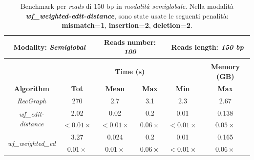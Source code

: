     \begin{table}[h]
        \centering
        \begin{tabular}{|c|c|c|c|c|c|}
            \hline
             \multicolumn{2}{|c|}{\textbf{Modality:} \emph{Semiglobal}} & \multicolumn{2}{|c|}{\textbf{Reads number: } \emph{100}} & \multicolumn{2}{|c|}{\textbf{Reads length:} \emph{150 bp}} \\
            \hline
                \multicolumn{6}{|c|}{} \\
            \hline
                & \multicolumn{4}{|c|}{\textbf{Time (s)}} & \textbf{Memory (GB)} \\
            \hline
                \textbf{Algorithm} & \textbf{Tot} & \textbf{Mean} & \textbf{Max} & \textbf{Min} & \textbf{Max} \\
            \hline
                \emph{RecGraph} & 270 & 2.7 & 3.1 & 2.3 & 2.67 \\
            \hline
                \multirow{2}{*}{\emph{wf\_edit-distance}} & 2.02 & 0.02 & 0.2 & 0.01 & 0.138 \\
                & $<0.01 \times$ & $<0.01 \times$ & $0.06 \times$ & $<0.01 \times$ & $0.05 \times$ \\
            \hline
                \multirow{2}{*}{\emph{wf\_weighted\_ed}} & 3.27 & 0.024 & 0.2 & 0.01 & 0.165 \\
                & $0.01 \times$ & $0.01 \times$ & $0.06 \times$ & $<0.01 \times$ & $0.06 \times$ \\
            \hline
        \end{tabular}
        \caption{Benchmark per \emph{reads} di 150 bp in \emph{modalità semiglobale}. Nella modalità \textbf{\textit{wf\_weighted-edit-distance}}, sono state usate le seguenti penalità: \textbf{mismatch=1}, \textbf{insertion=2}, \textbf{deletion=2}.}
        \label{tab:benchmark_semiglobal_150}
    \end{table}
    \vspace{20pt}
    
